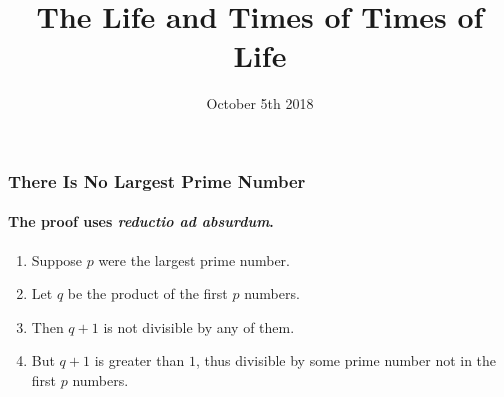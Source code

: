 \documentclass{beamer}
\title{The Life and Times of Times of Life}
\date[ISPN ’80]{October 5th 2018}
\begin{document}
\begin{frame}
\titlepage
\end{frame}

\begin{frame} 
\frametitle{There Is No Largest Prime Number} 
\framesubtitle{The proof uses \textit{reductio ad absurdum}.} 

\begin{enumerate} 
\item<1-| alert@1> Suppose $p$ were the largest prime number. 
\item<2-> Let $q$ be the product of the first $p$ numbers. 
\item<3-> Then $q+1$ is not divisible by any of them. 
\item<1-> But $q + 1$ is greater than $1$, thus divisible by some prime
number not in the first $p$ numbers.
\end{enumerate}
\end{frame}
\end{document}
